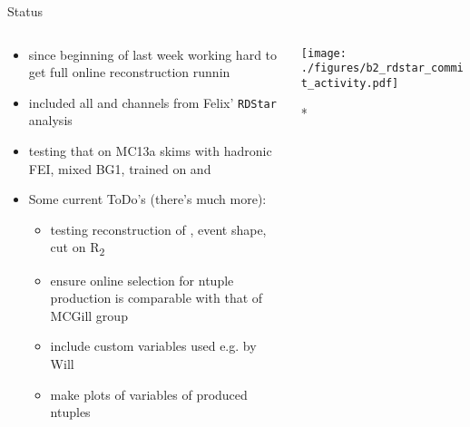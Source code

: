 \documentclass[aspectratio=169, 16pt]{beamer}
\begin{document}
\begin{frame}[label={sec:orga622488},fragile]{Status}
 \begin{columns}
\begin{column}{0.7\columnwidth}
\begin{itemize}
\item since beginning of last week working hard to get full online reconstruction
runnin
\item included all \PD and \PDstar channels from Felix' \texttt{RDStar} analysis
\item testing that on MC13a skims with hadronic FEI, mixed BG\texttimes{}1, trained on \PBzero
and \PBpm
\item Some current ToDo's (there's much more):
\begin{itemize}
\item testing reconstruction of \UpsilonFourS, event shape, cut on R\textsubscript{2}
\item ensure online selection for ntuple production is comparable with that of MCGill group
\item include custom variables used e.g. by Will
\item make plots of variables of produced ntuples
\end{itemize}
\end{itemize}
\end{column}
\begin{column}{0.3\columnwidth}
\begin{center}
\begin{center}
\texttt{[image: ./figures/b2\_rdstar\_commit\_activity.pdf]}
\end{center}
\end{center}
*
\end{column}
\end{columns}
\end{frame}
\end{document}
